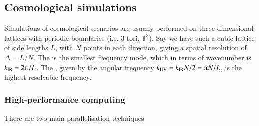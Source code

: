     




\subsection{Cosmological simulations}

    Simulations of cosmological scenarios are usually performed on three-dimensional lattices with periodic boundaries (i.e.  3-tori, $\mathbb{T}^3$). Say we have such a cubic lattice of side lengths $L$, with $N$ points in each direction, giving a spatial resolution of $\Delta=L/N$. %
    The  is the smallest frequency mode, which in terms of wavenumber is $k\ped{IR}=2\ppi/L$. %
    The , given by the angular frequency $k\ped{UV}=k\ped{IR} N/2 = \ppi N/L$, is the highest resolvable frequency.


    \subsubsection{High-performance computing}

    There are two main parallelisation techniques \blahblah
    
    

    

    
    

